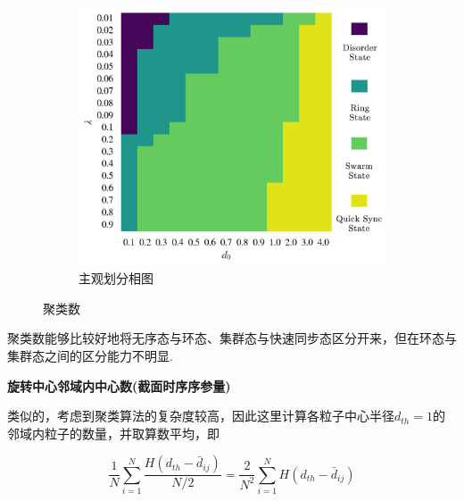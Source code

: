 \documentclass{article}
\begin{document}
\begin{figure}[H]
	\begin{subfigure}[b]{0.49\textwidth}
		\includegraphics[width=\textwidth]{./figs/subjectiveOp.png}
		\vspace{-1cm}
		\caption{主观划分相图}
	\end{subfigure}

	\vspace{-0.5cm}
	\caption{聚类数}
	\label{fig:fig234c.7}
\end{figure}

聚类数能够比较好地将无序态与环态、集群态与快速同步态区分开来，但在环态与集群态之间的区分能力不明显.

\noindent\textbf{旋转中心邻域内中心数(截面时序序参量)}

类似的，考虑到聚类算法的复杂度较高，因此这里计算各粒子中心半径$d_{th}=1$的邻域内粒子的数量，并取算数平均，即

$$
\frac{1}{N}\sum_{i=1}^N{\frac{H\left( d_{th}-\bar{d}_{ij} \right)}{N/2}}=\frac{2}{N^2}\sum_{i=1}^N{H\left( d_{th}-\bar{d}_{ij} \right)}
$$
\end{document}
